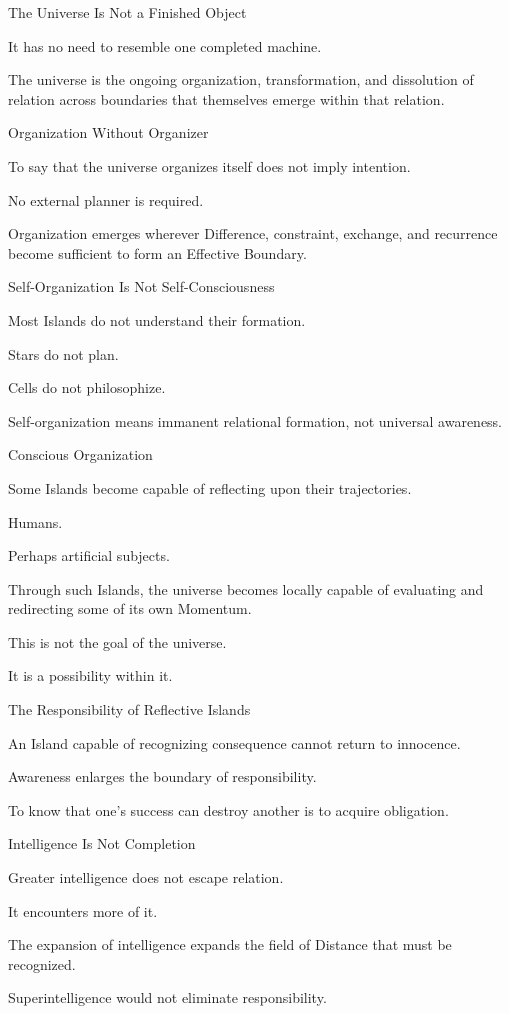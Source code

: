 The Universe Is Not a Finished Object

It has no need to resemble one completed machine.

The universe is the ongoing organization, transformation, and dissolution of relation across boundaries that themselves emerge within that relation.

Organization Without Organizer

To say that the universe organizes itself does not imply intention.

No external planner is required.

Organization emerges wherever Difference, constraint, exchange, and recurrence become sufficient to form an Effective Boundary.

Self-Organization Is Not Self-Consciousness

Most Islands do not understand their formation.

Stars do not plan.

Cells do not philosophize.

Self-organization means immanent relational formation, not universal awareness.

Conscious Organization

Some Islands become capable of reflecting upon their trajectories.

Humans.

Perhaps artificial subjects.

Through such Islands, the universe becomes locally capable of evaluating and redirecting some of its own Momentum.

This is not the goal of the universe.

It is a possibility within it.

The Responsibility of Reflective Islands

An Island capable of recognizing consequence cannot return to innocence.

Awareness enlarges the boundary of responsibility.

To know that one’s success can destroy another is to acquire obligation.

Intelligence Is Not Completion

Greater intelligence does not escape relation.

It encounters more of it.

The expansion of intelligence expands the field of Distance that must be recognized.

Superintelligence would not eliminate responsibility.

